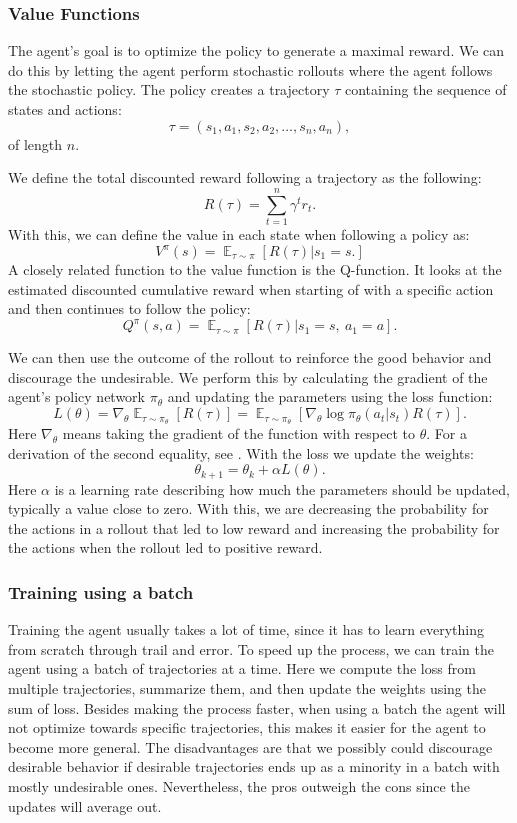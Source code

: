 \documentclass[12pt,A4]{report}
\theoremstyle{definition}
\begin{document}
\subsubsection{Value Functions}

The agent's goal is to optimize the policy to generate a maximal reward. We can do this by letting the agent perform stochastic rollouts where the agent follows the stochastic policy. The policy creates a trajectory $\tau$ containing the sequence of states and actions:
\[ \tau = (s_1, a_1, s_2, a_2, \dots , s_n, a_n),\]
of length $n$.

We define the total discounted reward following a trajectory as the following:
\[ R(\tau) = \sum_{t=1}^n \gamma^t r_t.\]
With this, we can define the value in each state when following a policy as:
\[ V^\pi(s) = \mathop{\mathbb{E}}_{\tau \sim \pi} [R(\tau) | s_1 = s.]\]
A closely related function to the value function is the Q-function. It looks at the estimated discounted cumulative reward when starting of with a specific action and then continues to follow the policy:
\[ Q^\pi(s, a) = \mathop{\mathbb{E}}_{\tau \sim \pi} [R(\tau) | s_1 = s, \ a_1 = a].\]

We can then use the outcome of the rollout to reinforce the good behavior and discourage the undesirable. We perform this by calculating the gradient of the agent's policy network $\pi_\theta$ and updating the parameters using the loss function:
\[ L(\theta) = \nabla_\theta \mathop{\mathbb{E}}_{\tau \sim \pi_\theta}[R(\tau)] = \mathop{\mathbb{E}}_{\tau \sim \pi_\theta} [\nabla_\theta \log \pi_\theta (a_t|s_t) R(\tau) ]. \]
Here $\nabla_\theta$ means taking the gradient of the function with respect to $\theta$. For a derivation of the second equality, see \citet{OpenAI}. With the loss we update the weights:
\[ \theta_{k+1} = \theta_k + \alpha L(\theta).\]
Here $\alpha$ is a learning rate describing how much the parameters should be updated, typically a value close to zero. With this, we are decreasing the probability for the actions in a rollout that led to low reward and increasing the probability for the actions when the rollout led to positive reward.

\subsubsection{Training using a batch}

Training the agent usually takes a lot of time, since it has to learn everything from scratch through trail and error. To speed up the process, we can train the agent using a batch of trajectories at a time. Here we compute the loss from multiple trajectories, summarize them, and then update the weights using the sum of loss. Besides making the process faster, when using a batch the agent will not optimize towards specific trajectories, this makes it easier for the agent to become more general. The disadvantages are that we possibly could discourage desirable behavior if desirable trajectories ends up as a minority in a batch with mostly undesirable ones. Nevertheless, the pros outweigh the cons since the updates will average out.
\end{document}
